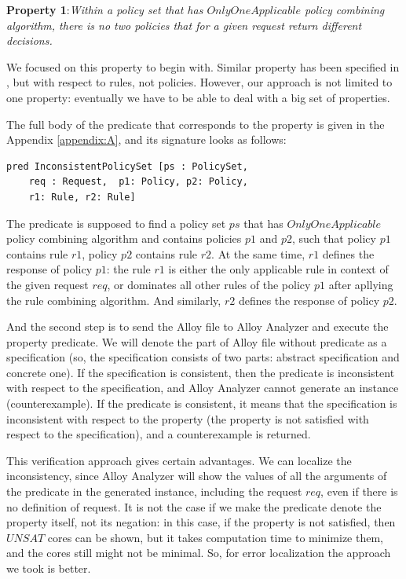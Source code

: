 \documentclass[letterpaper]{acm_proc_article-sp}
\begin{document}
\textbf{Property 1}:\textit{Within a policy set that has $OnlyOneApplicable$ policy combining algorithm, there is no two policies that for a given request return different decisions.}

We focused on this property to begin with. Similar property has been specified in \cite{acp:alloy}, but with respect to rules, not policies. However, our approach is not limited to one property: eventually we have to be able to deal with a big set of properties. 

The full body of the predicate that corresponds to the property is given in the Appendix \ref{appendix:A}, and its signature looks as follows:	

\begin{verbatim}
pred InconsistentPolicySet [ps : PolicySet, 
    req : Request,  p1: Policy, p2: Policy, 
    r1: Rule, r2: Rule]
\end{verbatim}

The predicate is supposed to find a policy set $ps$ that has $OnlyOneApplicable$ policy combining algorithm and contains policies $p1$ and $p2$, such that policy $p1$ contains rule $r1$, policy $p2$ contains rule $r2$. At the same time, $r1$ defines the response of policy $p1$: the rule $ r1$ is either the only applicable rule in context of the given request $req$, or dominates all other rules of the policy $p1$ after apllying the rule combining algorithm. And similarly, $r2$ defines the response of policy $p2$.

And the second step is to send the Alloy file to Alloy Analyzer and execute the property predicate. We will denote the part of Alloy file without predicate as a specification (so, the specification consists of two parts: abstract specification and concrete one). If the specification is consistent, then the predicate is inconsistent with respect to the specification, and Alloy Analyzer cannot generate an instance (counterexample). If the predicate is consistent, it means that the specification is inconsistent with respect to the property (the property is not satisfied with respect to the specification), and a counterexample is returned.

This verification approach gives certain advantages. We can localize the inconsistency, since Alloy Analyzer will show the values of all the arguments of the predicate in the generated instance, including the request $req$, even if there is no definition of request. It is not the case if we make the predicate denote the property itself, not its negation: in this case, if the property is not satisfied, then $UNSAT$ cores can be shown, but it takes computation time to minimize them, and the cores still might not be minimal. So, for error localization the approach we took is better.
\end{document}
